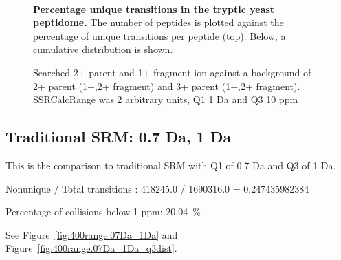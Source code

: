 \begin{figure}

\center
{} \\

\caption{ \textbf{Percentage unique transitions in the tryptic yeast peptidome.}
The number of peptides is plotted against the percentage of unique transitions
per peptide (top). Below, a cumulative distribution is shown.
}
\label{fig:400range.1Da_10ppm}
\end{figure}
\begin{figure}

\center
{}

\caption{
Searched 2+ parent and 1+ fragment ion against a background of 2+ parent (1+,2+ fragment) and 3+ parent (1+,2+ fragment).
SSRCalcRange was 2 arbitrary units, Q1 1 Da and Q3 10 ppm
}
\label{fig:400range.1Da_10ppm_q3dist}
\end{figure}


\subsection{Traditional SRM: 0.7 Da, 1 Da}

This is the comparison to traditional SRM with Q1 of 0.7 Da and Q3 of 1 Da.

Nonunique / Total transitions : 418245.0 / 1690316.0 = 0.247435982384

Percentage of collisions below 1 ppm: 20.04~\%


See Figure~\ref{fig:400range.07Da_1Da} and Figure~\ref{fig:400range.07Da_1Da_q3dist}.

